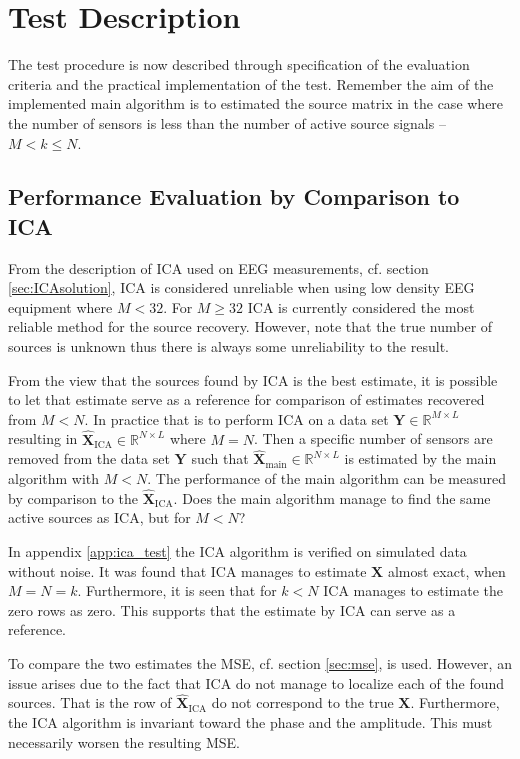 \section{Test Description}\label{seg:main_test_description}
The test procedure is now described through specification of the evaluation criteria and the practical implementation of the test.
Remember the aim of the implemented main algorithm is to estimated the source matrix in the case where the number of sensors is less than the number of active source signals -- $M < k \leq N$.

\subsection{Performance Evaluation by Comparison to ICA}
From the description of ICA used on EEG measurements, cf. section \ref{sec:ICAsolution}, ICA is considered unreliable when using low density EEG equipment where $M < 32$. 
For $M \geq 32$ ICA is currently considered the most reliable method for the source recovery. 
However, note that the true number of sources is unknown thus there is always some unreliability to the result. 

From the view that the sources found by ICA is the best estimate, it is possible to let that estimate serve as a reference for comparison of estimates recovered from $M < N$. 
In practice that is to perform ICA on a data set $\mathbf{Y} \in \mathbb{R}^{M \times L}$ resulting in $\hat{\mathbf{X}}_{\text{ICA}} \in \mathbb{R}^{N \times L}$ where $M = N$. 
Then a specific number of sensors are removed from the data set $\mathbf{Y}$ such that $\hat{\mathbf{X}}_{\text{main}} \in \mathbb{R}^{N\times L}$ is estimated by the main algorithm  with $M < N$. 
The performance of the main algorithm can be measured by comparison to the $\hat{\mathbf{X}}_{\text{ICA}}$. 
Does the main algorithm manage to find the same active sources as ICA, but for $M < N$?

In appendix \ref{app:ica_test} the ICA algorithm is verified on simulated data without noise. 
It was found that ICA manages to estimate $\mathbf{X}$ almost exact, when $M = N = k$. 
Furthermore, it is seen that for $k < N$ ICA manages to estimate the zero rows as zero. 
This supports that the estimate by ICA can serve as a reference.     

To compare the two estimates the MSE, cf. section \ref{sec:mse}, is used. 
However, an issue arises due to the fact that ICA do not manage to localize each of the found sources. 
That is the row of $\hat{\mathbf{X}}_{\text{ICA}}$ do not correspond to the true $\mathbf{X}$. 
Furthermore, the ICA algorithm is invariant toward the phase and the amplitude. 
This must necessarily worsen the resulting MSE.  

